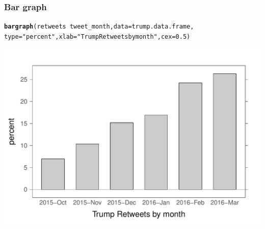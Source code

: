 \documentclass{beamer}\usepackage[]{graphicx}\usepackage[]{color}
\makeatletter
\newcommand{\hlnum}[1]{\textcolor[rgb]{0.2,0.2,0.2}{#1}}%
\newcommand{\hlstr}[1]{\textcolor[rgb]{0.2,0.2,0.2}{#1}}%
\newcommand{\hlopt}[1]{\textcolor[rgb]{0.102,0.102,0.102}{#1}}%
\newcommand{\hlstd}[1]{\textcolor[rgb]{0.102,0.102,0.102}{#1}}%
\newcommand{\hlkwc}[1]{\textcolor[rgb]{0.2,0.2,0.2}{#1}}%
\newcommand{\hlkwd}[1]{\textcolor[rgb]{0.102,0.102,0.102}{\textbf{#1}}}%
\newenvironment{kframe}{%
 \def\at@end@of@kframe{}%
 \ifinner\ifhmode%
  \def\at@end@of@kframe{\end{minipage}}%
  \begin{minipage}{\columnwidth}%
 \fi\fi%
 \def\FrameCommand##1{\hskip\@totalleftmargin \hskip-\fboxsep
 \colorbox{shadecolor}{##1}\hskip-\fboxsep
     \hskip-\linewidth \hskip-\@totalleftmargin \hskip\columnwidth}%
 \MakeFramed {\advance\hsize-\width
   \@totalleftmargin\z@ \linewidth\hsize
   \@setminipage}}%
 {\par\unskip\endMakeFramed%
 \at@end@of@kframe}
\newenvironment{knitrout}{}{} %
\renewenvironment{knitrout}{\begin{spacing}{0.75}\begin{tiny}}{\end{tiny}\end{spacing}}
\makeatother
\begin{document}
\begin{frame}[fragile]
\frametitle{Bar graph}

\begin{knitrout}\small
{}\color{fgcolor}\begin{kframe}
\begin{alltt}
\hlkwd{bargraph}\hlstd{(retweets} \hlopt{~} \hlstd{tweet_month,} \hlkwc{data}\hlstd{=trump.data.frame,}
   \hlkwc{type}\hlstd{=}\hlstr{"percent"}\hlstd{,} \hlkwc{xlab}\hlstd{=}\hlstr{"Trump Retweets by month"}\hlstd{,} \hlkwc{cex}\hlstd{=}\hlnum{0.5}\hlstd{)}
\end{alltt}
\end{kframe}

{\centering \includegraphics[width=0.99\linewidth]{figure/graphics-bar_retweets_1-1} 

}



\end{knitrout}

\end{frame}
\end{document}
